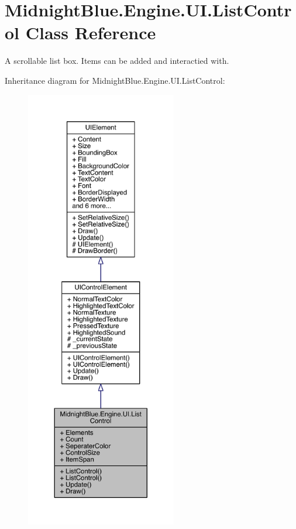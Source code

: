 \hypertarget{class_midnight_blue_1_1_engine_1_1_u_i_1_1_list_control}{}\section{Midnight\+Blue.\+Engine.\+U\+I.\+List\+Control Class Reference}
\label{class_midnight_blue_1_1_engine_1_1_u_i_1_1_list_control}


A scrollable list box. Items can be added and interactied with.  




Inheritance diagram for Midnight\+Blue.\+Engine.\+U\+I.\+List\+Control\+:
\nopagebreak
\begin{figure}[H]
\begin{center}
\leavevmode
\includegraphics[height=550pt]{class_midnight_blue_1_1_engine_1_1_u_i_1_1_list_control__inherit__graph}
\end{center}
\end{figure}


